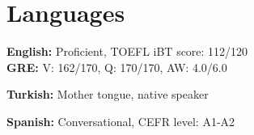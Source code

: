 
\section{Languages}

\begin{denseouterlist}
\item \textbf{English:} Proficient, TOEFL iBT score: 112/120 \\
    {\textbf{GRE:} V: 162/170, Q: 170/170, AW: 4.0/6.0}
\item \textbf{Turkish:} Mother tongue, native speaker
\item \textbf{Spanish:} Conversational, CEFR level: A1-A2
\end{denseouterlist}
